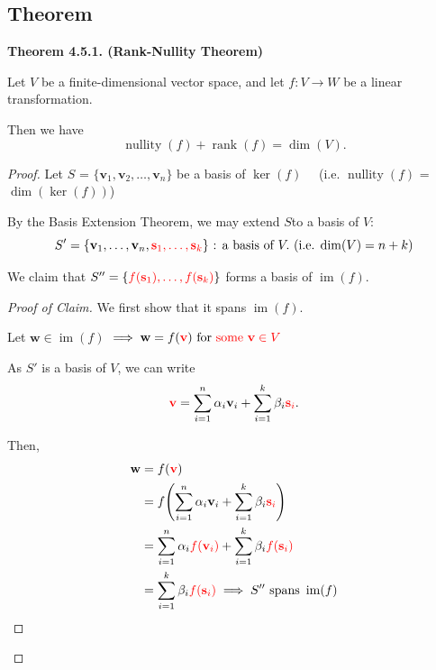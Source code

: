 \documentclass[12pt]{article}
\begin{document}
\newpage

\subsection{Theorem}

\textbf{Theorem 4.5.1. (Rank-Nullity Theorem)}

Let $V$ be a finite-dimensional vector space, and let $f:V\rightarrow W$ be a linear transformation.

Then we have
\[
\operatorname{nullity}(f)+\operatorname{rank}(f)=\operatorname{dim}(V).
\]


\begin{proof}

Let $S$ = $\{\mathbf{v}_1,\mathbf{v}_2,\ldots,\mathbf{v}_n\}$ be a basis of $\operatorname{ker}(f)\quad$
(i.e. $\operatorname{nullity}(f)$ = $\operatorname{dim}(\operatorname{ker}(f))$)

By the Basis Extension Theorem, we may extend $S$to a basis of $V$:
\[
S'=\{\mathbf{v}_1,\ldots,\mathbf{v}_n,\textcolor{red}{\mathbf{s}_1,\ldots,\mathbf{s}_k}\}\text{ : a basis of }V.\text{ (i.e. $\operatorname{dim}(V)=n+k$)} 
\]

We claim that $S''=\{\textcolor{red}{f(\mathbf{s}_1),\ldots,f(\mathbf{s}_k)}\}$ forms a basis of $\operatorname{im}(f)$.

\begin{proof}[Proof of Claim]

We first show that it spans $\operatorname{im}(f)$.

Let $\mathbf{w}\in\operatorname{im}(f)$ $\implies \mathbf{w}=f(\textcolor{red}{\mathbf{v}}) \text{ for \textcolor{red}{some $\mathbf{v} \in V$} } $

As $S'$ is a basis of $V$, we can write
\[
\textcolor{red}{\mathbf{v}}=\sum_{i=1}^{n}\alpha_i\mathbf{v}_i+\sum_{i=1}^{k}\beta_i\textcolor{red}{\mathbf{s}_i}.
\]

Then,
\begin{align*}
\mathbf{w}
&=
f(\textcolor{red}{\mathbf{v}}) \\
&=
f\!\left(
\sum_{i=1}^{n}\alpha_i\mathbf{v}_i+\sum_{i=1}^{k}\beta_i\textcolor{red}{\mathbf{s}_i}
\right) \\
&=
\sum_{i=1}^{n}\alpha_i\textcolor{red}{f(\mathbf{v}_i)}+\sum_{i=1}^{k}\beta_i\textcolor{red}{f(\mathbf{s}_i)} \\
&= 
\sum_{i=1}^{k}\beta_i\textcolor{red}{f(\mathbf{s}_i)} \implies S''\text{ spans }\operatorname{im}(f)
\end{align*}


\end{proof}
\end{proof}
\end{document}
